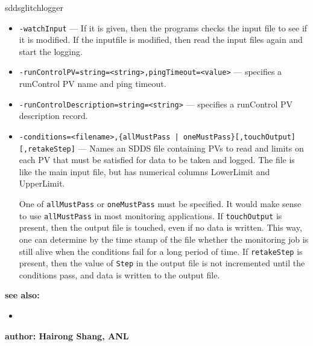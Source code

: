 \begin{sddsprog}{sddsglitchlogger}
\begin{itemize}
        \item {\tt -watchInput} --- If it is given, then the programs checks the input file to see if
                it is modified. If the inputfile is modified, then read the input files again and start
                the logging.
        \item {\tt -runControlPV=string=<string>,pingTimeout=<value>} --- specifies a runControl PV name
                and ping timeout.
        \item {\tt -runControlDescription=string=<string>} --- specifies a runControl PV description record.
        \item {\verb+-conditions=<filename>,{allMustPass | oneMustPass}[,touchOutput][,retakeStep]+} ---
                   Names an SDDS file containing PVs to read and limits on each PV that must
                   be satisfied for data to be taken and logged.  The file is like the main
                   input file, but has numerical columns LowerLimit and UpperLimit.

                One of \verb+allMustPass+ or \verb+oneMustPass+ must be specified. It would make sense
                to use \verb+allMustPass+ in most monitoring applications.
                If \verb+touchOutput+ is present, then the output file is touched, even if no data
                is written. This way, one can determine by the time stamp of the file
                whether the monitoring job is still alive
                when the conditions fail for a long period of time. If \verb+retakeStep+ is
                present, then the value of \verb+Step+ in the output file is not
                incremented until the conditions pass, and data is written to the output file.
    \end{itemize}

\item {\bf see also:}
    \begin{itemize}
    \item {}
    \end{itemize}
\item {\bf author: Hairong Shang, ANL} 
\end{sddsprog}

